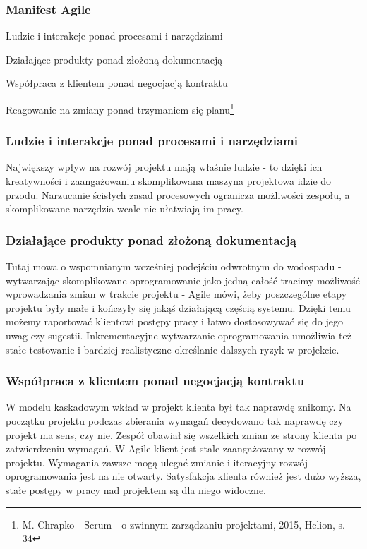 \documentclass{article}
\begin{document}
\subsubsection{Manifest Agile}

\begin{center}
    Ludzie i interakcje ponad procesami i narzędziami

    Działające produkty ponad złożoną dokumentacją

    Współpraca z klientem ponad negocjacją kontraktu

    Reagowanie na zmiany ponad trzymaniem się planu\footnote{M. Chrapko - Scrum - o zwinnym zarządzaniu projektami, 2015, Helion, s. 34}
\end{center}

\subsubsection*{Ludzie i interakcje ponad procesami i narzędziami}
Największy wpływ na rozwój projektu mają właśnie ludzie - to dzięki ich kreatywności i zaangażowaniu skomplikowana maszyna projektowa idzie do przodu. Narzucanie ścisłych zasad procesowych ogranicza możliwości zespołu, a skomplikowane narzędzia wcale nie ułatwiają im pracy.

\subsubsection*{Działające produkty ponad złożoną dokumentacją}
Tutaj mowa o wspomnianym wcześniej podejściu odwrotnym do wodospadu - wytwarzając skomplikowane oprogramowanie jako jedną całość tracimy możliwość wprowadzania zmian w trakcie projektu - Agile mówi, żeby poszczególne etapy projektu były małe i kończyły się jakąś działającą częścią systemu. Dzięki temu możemy raportować klientowi postępy pracy i łatwo dostosowywać się do jego uwag czy sugestii. Inkrementacyjne wytwarzanie oprogramowania umożliwia też stałe testowanie i bardziej realistyczne określanie dalszych ryzyk w projekcie.

\subsubsection*{Współpraca z klientem ponad negocjacją kontraktu}
W modelu kaskadowym wkład w projekt klienta był tak naprawdę znikomy. Na początku projektu podczas zbierania wymagań decydowano tak naprawdę czy projekt ma sens, czy nie. Zespół obawiał się wszelkich zmian ze strony klienta po zatwierdzeniu wymagań. W Agile klient jest stale zaangażowany w rozwój projektu. Wymagania zawsze mogą ulegać zmianie i iteracyjny rozwój oprogramowania jest na nie otwarty. Satysfakcja klienta również jest dużo wyższa, stałe postępy w pracy nad projektem są dla niego widoczne.
\end{document}
